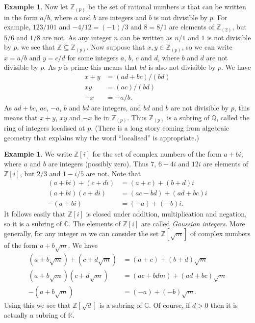 \documentclass{amsart}
\newcommand{\Z}         {{\mathbb{Z}}}
\newcommand{\Q}         {{\mathbb{Q}}}
\newcommand{\R}         {{\mathbb{R}}}
\newcommand{\C}         {{\mathbb{C}}}
\newcommand{\sse}       {\subseteq}
\renewcommand{\:}{\colon}
\theoremstyle{definition}
\newtheorem{example}[theorem]{Example}
\begin{document}
\begin{example}
 Now let $\Z_{(p)}$ be the set of rational numbers $x$ that can be
 written in the form $a/b$, where $a$ and $b$ are integers and $b$ is
 not divisible by $p$.  For example, $123/101$ and $-4/12=(-1)/3$ and
 $8=8/1$ are elements of $\Z_{(2)}$, but $5/6$ and $1/8$ are not.  As
 any integer $n$ can be written as $n/1$ and $1$ is not divisible by
 $p$, we see that $\Z\sse\Z_{(p)}$.  Now suppose that
 $x,y\in\Z_{(p)}$, so we can write $x=a/b$ and $y=c/d$ for some
 integers $a$, $b$, $c$ and $d$, where $b$ and $d$ are not divisible
 by $p$.  As $p$ is prime this means that $bd$ is also not divisible
 by $p$.  We have
 \begin{align*}
  x+y &= (ad+bc)/(bd) \\
  xy  &= (ac)/(bd)    \\
  -x  &= -a/b.
 \end{align*}
 As $ad+bc$, $ac$, $-a$, $b$ and $bd$ are integers, and $bd$ and $b$
 are not divisible by $p$, this means that $x+y$, $xy$ and $-x$ lie in
 $\Z_{(p)}$.  Thus $\Z_{(p)}$ is a subring of $\Q$, called the ring of
 integers localised at $p$.  (There is a long story coming from
 algebraic geometry that explains why the word ``localised'' is
 appropriate.)
\end{example}
\begin{example}\label{eg-gaussian}
 We write $\Z[i]$ for the set of complex numbers of the form $a+bi$,
 where $a$ and $b$ are integers (possibly zero).  Thus $7$, $6-4i$ and
 $12i$ are elements of $\Z[i]$, but $2/3$ and $1-i/5$ are not.  Note
 that 
 \begin{align*}
  (a+bi)+(c+di) &= (a+c) + (b+d)i \\
  (a+bi)(c+di) &= (ac-bd) + (ad+bc)i \\
  -(a+bi) &= (-a) + (-b)i.
 \end{align*}
 It follows easily that $\Z[i]$ is closed under addition,
 multiplication and negation, so it is a subring of $\C$.  The
 elements of $\Z[i]$ are called \emph{Gaussian integers}.  More
 generally, for any integer $m$ we can consider the set $\Z[\sqrt{m}]$
 of complex numbers of the form $a+b\sqrt{m}$.  We have
 \begin{align*}
  (a+b\sqrt{m})+(c+d\sqrt{m}) &= (a+c) + (b+d)\sqrt{m} \\
  (a+b\sqrt{m})(c+d\sqrt{m}) &= (ac + bdm) + (ad+bc)\sqrt{m} \\
  -(a+b\sqrt{m}) &= (-a) + (-b)\sqrt{m}. 
 \end{align*}
 Using this we see that $\Z[\sqrt{d}]$ is a subring of $\C$.  Of
 course, if $d>0$ then it is actually a subring of $\R$.
\end{example}
\end{document}
